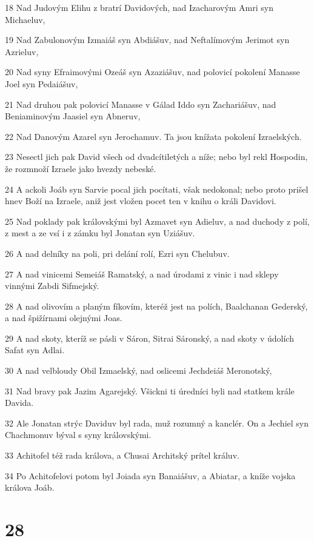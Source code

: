 \par 18 Nad Judovým Elihu z bratrí Davidových, nad Izacharovým Amri syn Michaeluv,
\par 19 Nad Zabulonovým Izmaiáš syn Abdiášuv, nad Neftalímovým Jerimot syn Azrieluv,
\par 20 Nad syny Efraimovými Ozeáš syn Azaziášuv, nad polovicí pokolení Manasse Joel syn Pedaiášuv,
\par 21 Nad druhou pak polovicí Manasse v Gálad Iddo syn Zachariášuv, nad Beniaminovým Jaasiel syn Abneruv,
\par 22 Nad Danovým Azarel syn Jerochamuv. Ta jsou knížata pokolení Izraelských.
\par 23 Nesectl jich pak David všech od dvadcítiletých a níže; nebo byl rekl Hospodin, že rozmnoží Izraele jako hvezdy nebeské.
\par 24 A ackoli Joáb syn Sarvie pocal jich pocítati, však nedokonal; nebo proto prišel hnev Boží na Izraele, aniž jest vložen pocet ten v knihu o králi Davidovi.
\par 25 Nad poklady pak královskými byl Azmavet syn Adieluv, a nad duchody z polí, z mest a ze vsí i z zámku byl Jonatan syn Uziášuv.
\par 26 A nad delníky na poli, pri delání rolí, Ezri syn Chelubuv.
\par 27 A nad vinicemi Semeiáš Ramatský, a nad úrodami z vinic i nad sklepy vinnými Zabdi Sifmejský.
\par 28 A nad olivovím a planým fíkovím, kteréž jest na polích, Baalchanan Gederský, a nad špižírnami olejnými Joas.
\par 29 A nad skoty, kteríž se pásli v Sáron, Sitrai Sáronský, a nad skoty v údolích Safat syn Adlai.
\par 30 A nad velbloudy Obil Izmaelský, nad oslicemi Jechdeiáš Meronotský,
\par 31 Nad bravy pak Jazim Agarejský. Všickni ti úredníci byli nad statkem krále Davida.
\par 32 Ale Jonatan strýc Daviduv byl rada, muž rozumný a kanclér. On a Jechiel syn Chachmonuv býval s syny královskými.
\par 33 Achitofel též rada králova, a Chusai Architský prítel králuv.
\par 34 Po Achitofelovi potom byl Joiada syn Banaiášuv, a Abiatar, a kníže vojska králova Joáb.

\chapter{28}

